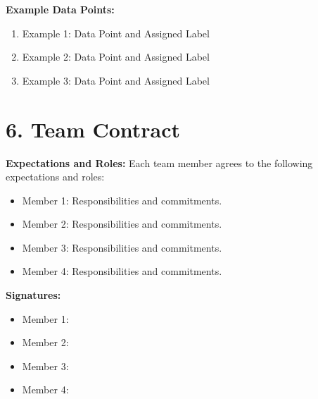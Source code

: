\documentclass{article}
\begin{document}
\textbf{Example Data Points:}
\begin{enumerate}
    \item Example 1: Data Point and Assigned Label
    \item Example 2: Data Point and Assigned Label
    \item Example 3: Data Point and Assigned Label
\end{enumerate}

\section*{6. Team Contract}
\textbf{Expectations and Roles:}  
Each team member agrees to the following expectations and roles:
\begin{itemize}
    \item Member 1: Responsibilities and commitments.
    \item Member 2: Responsibilities and commitments.
    \item Member 3: Responsibilities and commitments.
    \item Member 4: Responsibilities and commitments.
\end{itemize}

\textbf{Signatures:}
\begin{itemize}
    \item Member 1: \underline{\hspace{6cm}}
    \item Member 2: \underline{\hspace{6cm}}
    \item Member 3: \underline{\hspace{6cm}}
    \item Member 4: \underline{\hspace{6cm}}
\end{itemize}
\end{document}
